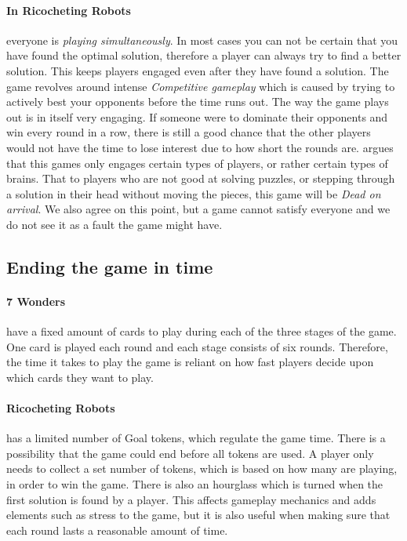\documentclass[a4paper]{article}
\begin{document}
\paragraph{In Ricocheting Robots} everyone is \textit{playing simultaneously}. In most cases you can not be certain that you have found the optimal solution, therefore a player can always try to find a better solution. This keeps players engaged even after they have found a solution. The game revolves around intense \textit{Competitive gameplay} which is caused by trying to actively best your opponents before the time runs out. The way the game plays out is in itself very engaging. If someone were to dominate their opponents and win every round in a row, there is still a good chance that the other players would not have the time to lose interest due to how short the rounds are.  argues that this games only engages certain types of players, or rather certain types of brains. That to players who are not good at solving puzzles, or stepping through a solution in their head without moving the pieces, this game will be \textit{Dead on arrival}. We also agree on this point, but a game cannot satisfy everyone and we do not see it as a fault the game might have.

\subsection{Ending the game in time}
\paragraph{7 Wonders} have a fixed amount of cards to play during each of the three stages of the game. One card is played each round and each stage consists of six rounds. Therefore, the time it takes to play the game is reliant on how fast players decide upon which cards they want to play.


\paragraph{Ricocheting Robots} has a limited number of Goal tokens, which regulate the game time. There is a possibility that the game could end before all tokens are used. A player only needs to collect a set number of tokens, which is based on how many are playing, in order to win the game. There is also an hourglass which is turned when the first solution is found by a player. This affects gameplay mechanics and adds elements such as stress to the game, but it is also useful when making sure that each round lasts a reasonable amount of time. 
\end{document}
